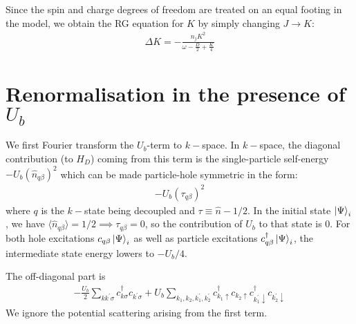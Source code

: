 Since the spin and charge degrees of freedom are treated on an equal footing in the model, we obtain the RG equation for \(K\) by simply changing \(J \to K\):
\begin{equation}\begin{aligned}
	\Delta K = -\frac{n_j K^2}{\omega - \frac{D}{2} + \frac{K}{4}}
\end{aligned}\end{equation}

\section{Renormalisation in the presence of \(U_b\)}

We first Fourier transform the \(U_b\)-term to \(k-\)space. In \(k-\)space, the diagonal contribution (to \(H_D\)) coming from this term is the single-particle self-energy \(-U_b\left(\hat n_{q \beta}\right)^2\) which can be made particle-hole symmetric in the form:
\begin{equation}\begin{aligned}
	-U_b\left(\tau_{q \beta}\right)^2
\end{aligned}\end{equation}
where \(q\) is the \(k-\)state being decoupled and \(\tau \equiv \hat n - 1/2\). In the initial state \(\ket{\Psi}_i\), we have \(\langle \hat n_{q\beta} \rangle = 1/2 \implies \tau_{q\beta} = 0\), so the contribution of \(U_b\) to that state is 0. For both hole excitations \(c_{q\beta}\ket{\Psi}_i\) as well as particle excitations \(c^\dagger_{q\beta}\ket{\Psi}_i\), the intermediate state energy lowers to \(-U_b/4\).

The off-diagonal part is
\begin{equation}\begin{aligned}
	-\frac{U_b}{2}\sum_{kk^\prime\sigma}c^\dagger_{k\sigma}c_{k^\prime\sigma} + U_b \sum_{k_1,k_2,k_1^\prime,k_2^\prime} c^\dagger_{k_1 \uparrow}c_{k_2 \uparrow} c^\dagger_{k^\prime_1 \downarrow}c_{k^\prime_2 \downarrow} 
\end{aligned}\end{equation}
We ignore the potential scattering arising from the first term.

